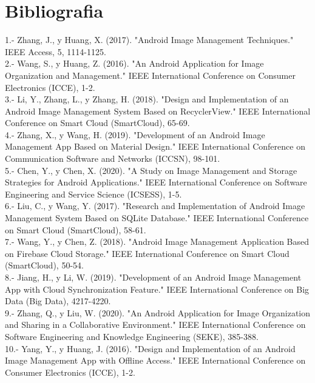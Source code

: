 \documentclass[conference]{IEEEtran}
\begin{document}
\section{Bibliografia}
1.- Zhang, J., y Huang, X. (2017). "Android Image Management Techniques." IEEE Access, 5, 1114-1125.\\
2.- Wang, S., y Huang, Z. (2016). "An Android Application for Image Organization and Management." IEEE International Conference on Consumer Electronics (ICCE), 1-2.\\
3.- Li, Y., Zhang, L., y Zhang, H. (2018). "Design and Implementation of an Android Image Management System Based on RecyclerView." IEEE International Conference on Smart Cloud (SmartCloud), 65-69.\\
4.- Zhang, X., y Wang, H. (2019). "Development of an Android Image Management App Based on Material Design." IEEE International Conference on Communication Software and Networks (ICCSN), 98-101.\\
5.- Chen, Y., y Chen, X. (2020). "A Study on Image Management and Storage Strategies for Android Applications." IEEE International Conference on Software Engineering and Service Science (ICSESS), 1-5.\\
6.- Liu, C., y Wang, Y. (2017). "Research and Implementation of Android Image Management System Based on SQLite Database." IEEE International Conference on Smart Cloud (SmartCloud), 58-61.\\
7.- Wang, Y., y Chen, Z. (2018). "Android Image Management Application Based on Firebase Cloud Storage." IEEE International Conference on Smart Cloud (SmartCloud), 50-54.\\
8.- Jiang, H., y Li, W. (2019). "Development of an Android Image Management App with Cloud Synchronization Feature." IEEE International Conference on Big Data (Big Data), 4217-4220.\\
9.- Zhang, Q., y Liu, W. (2020). "An Android Application for Image Organization and Sharing in a Collaborative Environment." IEEE International Conference on Software Engineering and Knowledge Engineering (SEKE), 385-388.\\
10.- Yang, Y., y Huang, J. (2016). "Design and Implementation of an Android Image Management App with Offline Access." IEEE International Conference on Consumer Electronics (ICCE), 1-2.\\
\end{document}
